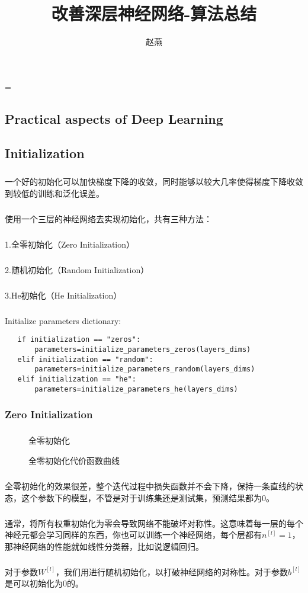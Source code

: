 \documentclass{article}
\title{改善深层神经网络-算法总结}
\author{赵燕}
\date{}
\begin{document}
 
\hfuzz=\maxdimen
{}
\begin{CJK}{UTF8}{gbsn} 
\maketitle
\renewcommand\contentsname{目录}
\renewcommand\figurename{图}
\tableofcontents
\newpage

\section{Practical aspects of Deep Learning}
\subsection{Initialization}
\subparagraph{}
一个好的初始化可以加快梯度下降的收敛，同时能够以较大几率使得梯度下降收敛到较低的训练和泛化误差。
\subparagraph{}
使用一个三层的神经网络去实现初始化，共有三种方法：
\subparagraph{}
1.全零初始化（Zero Initialization）
\subparagraph{}
2.随机初始化（Random Initialization）
\subparagraph{}
3.He初始化（He Initialization）
\subparagraph{}
Initialize parameters dictionary:
   \begin{verbatim}
   if initialization == "zeros":
       parameters=initialize_parameters_zeros(layers_dims)
   elif initialization == "random":
       parameters=initialize_parameters_random(layers_dims)
   elif initialization == "he":
       parameters=initialize_parameters_he(layers_dims)
   \end{verbatim}
\subsubsection{Zero Initialization}
\subparagraph{}
\begin{figure}[H]
\label{fig:11}
\caption{全零初始化}
\end{figure}
\begin{figure}[H]
\label{fig:13}
\caption{全零初始化代价函数曲线}
\end{figure}
\subparagraph{}
全零初始化的效果很差，整个迭代过程中损失函数并不会下降，保持一条直线的状态，这个参数下的模型，不管是对于训练集还是测试集，预测结果都为0。
\subparagraph{}
通常，将所有权重初始化为零会导致网络不能破坏对称性。这意味着每一层的每个神经元都会学习同样的东西，你也可以训练一个神经网络，每个层都有$n^{[l]}=1$，那神经网络的性能就如线性分类器，比如说逻辑回归。
\subparagraph{}
对于参数$W^{[l]}$，我们用进行随机初始化，以打破神经网络的对称性。对于参数$b^{[l]}$是可以初始化为0的。

\end{CJK}
\end{document}
